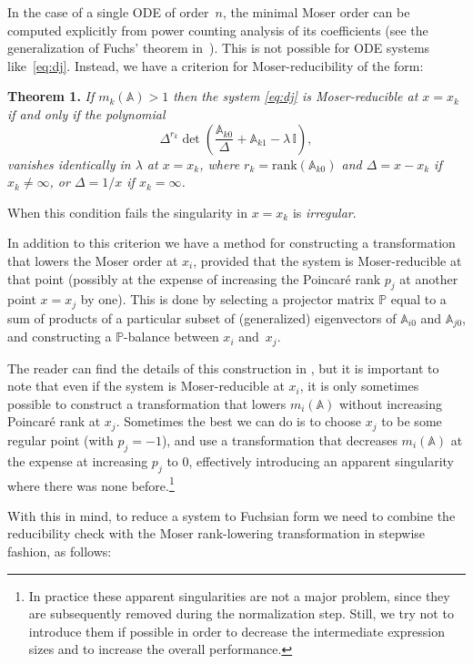 \documentclass{elsarticle}
\newcommand{\rank}{\mathrm{rank}}
\newcommand{\M}[1]{\mathbb{#1}} %
\begin{document}
In the case of a single ODE of order~$n$, the minimal Moser order can be computed explicitly from power counting analysis of its coefficients (see the generalization of Fuchs' theorem in~\cite{Mos59}).
This is not possible for ODE systems like~\eqref{eq:dj}.
Instead, we have a criterion for Moser-reducibility of the form:

\textbf{Theorem 1.}
{\em If $m_k(\M A) > 1$ then the system \eqref{eq:dj} is Moser-reducible at $x=x_k$ if and only if the polynomial}
\begin{equation}
\label{eq:red_cond}
    \Delta^{r_k} \det\left(\frac{\M A_{k0}}{\Delta} + \M A_{k1} - \lambda \,\M I\right),
\end{equation}
{\em vanishes identically in $\lambda$ at $x=x_k$, where $r_k=\rank(\M A_{k0})$ and $\Delta=x-x_k$ if $x_k\ne\infty$, or $\Delta=1/x$ if $x_k=\infty$.}

When this condition fails the singularity in $x=x_k$ is {\em irregular}.

In addition to this criterion we have a method for constructing a transformation that lowers the Moser order at $x_i$, provided that the system is Moser-reducible at that point (possibly at the expense of increasing the Poincar\'e rank $p_j$ at another point $x=x_j$ by one).
This is done by selecting a projector matrix $\M P$ equal to a sum of products of a particular subset of (generalized) eigenvectors of $\M A_{i0}$ and $\M A_{j0}$, and constructing a $\M P$-balance between $x_i$ and~$x_j$.

The reader can find the details of this construction in \cite{Lee15}, but it is important to note that even if the system is Moser-reducible at $x_i$, it is only sometimes possible to construct a transformation that lowers $m_i(\M A)$ without increasing Poincar\'e rank at $x_j$.
Sometimes the best we can do is to choose $x_j$ to be some regular point (with $p_j=-1$), and use a transformation that decreases $m_i(\M A)$ at the expense at increasing $p_j$ to $0$, effectively introducing an apparent singularity where there was none before.\footnote{
    In practice these apparent singularities are not a major problem, since they are subsequently removed during the normalization step.
    Still, we try not to introduce them if possible in order to decrease the intermediate expression sizes and to increase the overall performance.
}

With this in mind, to reduce a system to Fuchsian form we need to combine the reducibility check with the Moser rank-lowering transformation in stepwise fashion, as follows:
\end{document}
